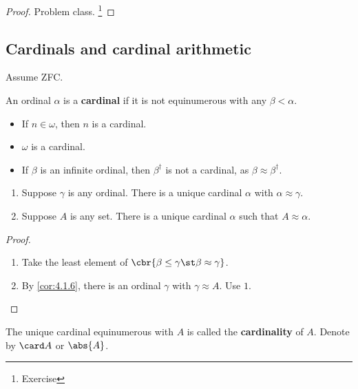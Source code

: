 \begin{proof}
Problem class. \footnote{Exercise}
\end{proof}

\pagebreak

\subsection{Cardinals and cardinal arithmetic}

Assume ZFC.

\begin{definition}
An ordinal $ \alpha $ is a \textbf{cardinal} if it is not equinumerous with any $ \beta < \alpha $.
\end{definition}

\begin{example*}
\hfill
\begin{itemize}
\item If $ n \in \omega $, then $ n $ is a cardinal.
\item $ \omega $ is a cardinal.
\item If $ \beta $ is an infinite ordinal, then $ \beta^\dagger $ is not a cardinal, as $ \beta \approx \beta^\dagger $.
\end{itemize}
\end{example*}

\begin{lemma}
\hfill
\begin{enumerate}
\item Suppose $ \gamma $ is any ordinal. There is a unique cardinal $ \alpha $ with $ \alpha \approx \gamma $.
\item Suppose $ A $ is any set. There is a unique cardinal $ \alpha $ such that $ A \approx \alpha $.
\end{enumerate}
\end{lemma}

\begin{proof}
\hfill
\begin{enumerate}
\item Take the least element of $ \cbr{\beta \le \gamma \st \beta \approx \gamma} $.
\item By \ref{cor:4.1.6}, there is an ordinal $ \gamma $ with $ \gamma \approx A $. Use $ 1 $.
\end{enumerate}
\end{proof}

\begin{definition}
The unique cardinal equinumerous with $ A $ is called the \textbf{cardinality} of $ A $. Denote by $ \card A $ or $ \abs{A} $.
\end{definition}

